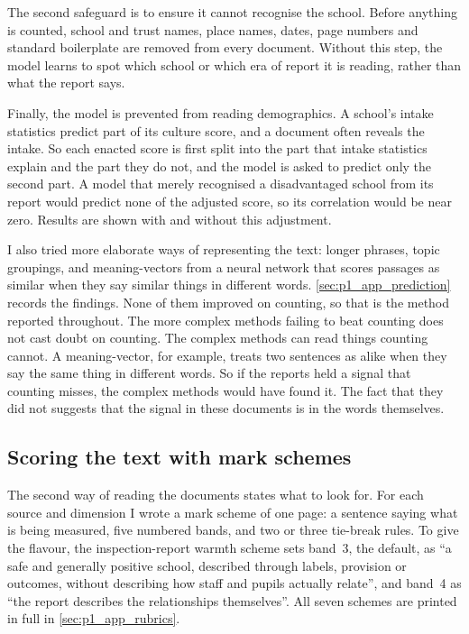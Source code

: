 The second safeguard is to ensure it cannot recognise the school. Before anything is counted, school
and trust names, place names, dates, page numbers and standard boilerplate
are removed from every document. Without this step, the model learns to spot which school or which era of report it is reading,
rather than what the report says.

Finally, the model is prevented from reading demographics. A school's intake
statistics predict part of its culture score, and a document often reveals
the intake. So each enacted score is first split into the part that
intake statistics explain and the part they do not, and the model is asked
to predict only the second part. A model that merely recognised a
disadvantaged school from its report would predict none of the adjusted score, so its correlation would be near zero. Results are
shown with and without this adjustment.

I also tried more elaborate ways of representing the text:
longer phrases, topic groupings, and meaning-vectors from a neural network that scores passages as
similar when they say similar
things in different words. \cref{sec:p1_app_prediction} records the findings. None of them improved on counting, so that is the method reported throughout. The more complex methods
failing to beat
counting does not cast doubt on counting. The complex methods can read things counting cannot.
A meaning-vector, for example, treats two sentences as alike when they say the same thing in
different words. So if the reports held a signal that counting misses, the complex methods
would have found it. The fact that they did not suggests that the signal in these documents is in
the words themselves.

\subsection{Scoring the text with mark schemes}
\label{sec:p1_rubrics}

The second way of reading the documents states what to look for. For each
source and dimension I wrote a mark scheme of one page: a sentence
saying what is being measured, five numbered bands, and two or three
tie-break rules. To give the flavour, the inspection-report warmth scheme
sets band~3, the default, as ``a safe and generally positive school,
described through labels, provision or outcomes, without describing how
staff and pupils actually relate'', and band~4 as ``the report describes
the relationships themselves''. All seven schemes are printed in full in \cref{sec:p1_app_rubrics}.

